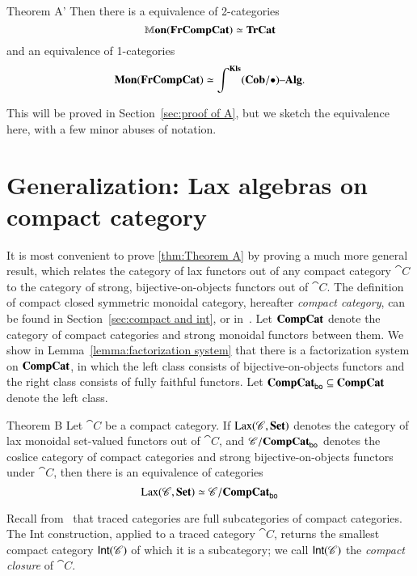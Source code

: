 \documentclass[12pt,oneside,article,draft]{memoir}
\begin{document}
\begin{named}{Theorem A'}
	Then there is a equivalence of 2-categories
		$$\mathbb{M}\mathbf{on}(\mathbf{FrCompCat})\simeq\mathbf{TrCat}$$
	and an equivalence of 1-categories
		$$\mathbf{Mon}(\mathbf{FrCompCat})\simeq\int^{\mathbf{Kls}}(\mathbf{Cob}/\bullet){\text \textendash}\mathbf{Alg}.$$
\end{named}

This will be proved in Section~\ref{sec:proof of A}, but we sketch the equivalence here, with a few minor abuses of notation.


\section{Generalization: Lax algebras on compact category}

It is most convenient to prove \ref{thm:Theorem A} by proving a much more general result, which relates the category of lax functors out of any compact category $\cat{C}$ to the category of strong, bijective-on-objects functors out of $\cat{C}$.
The definition of compact closed symmetric monoidal category, hereafter \emph{compact category}, can be found in Section~\ref{sec:compact and int}, or in~\cite{MacLane}.
Let $\mathbf{CompCat}$ denote the category of compact categories and strong monoidal functors between them.
We show in Lemma~\ref{lemma:factorization system} that there is a factorization system on $\mathbf{CompCat}$, in which the left class consists of bijective-on-objects functors and the right class consists of fully faithful functors.
Let $\mathbf{CompCat}_{\mathsf{bo}}\subseteq\mathbf{CompCat}$ denote the left class.

\begin{named}{Theorem B}
	Let $\cat{C}$ be a compact category.
	If $\operatorname{Lax}(\mathscr{C},\mathbf{Set})$ denotes the category of lax monoidal set-valued functors out of $\cat{C}$, and $\mathscr{C}/\mathbf{CompCat}_{\mathsf{bo}}$ denotes the coslice category of compact categories and strong bijective-on-objects functors under $\cat{C}$, then there is an equivalence of categories
	\begin{equation}\label{dia:compact lax strong}
		\operatorname{Lax}(\mathscr{C},\mathbf{Set})\simeq\mathscr{C}/\mathbf{CompCat}_{\mathsf{bo}}
	\end{equation}
\end{named}

Recall from~\cite{JoyalStreetVerity} that traced categories are full subcategories of compact categories.
The Int construction, applied to a traced category $\cat{C}$, returns the smallest compact category $\mathsf{Int}(\mathscr{C})$ of which it is a subcategory; we call $\mathsf{Int}(\mathscr{C})$ the \emph{compact closure} of $\cat{C}$. 
\end{document}
